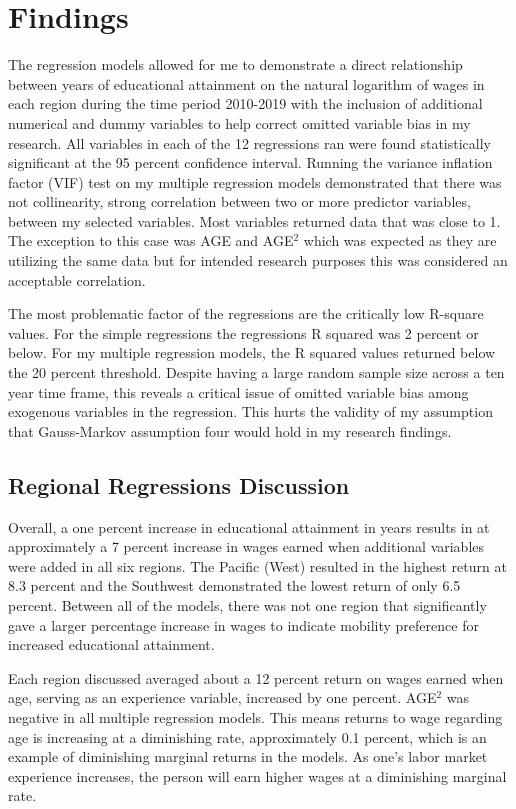 \documentclass[12pt, English]{article}
\begin{document}
\section{Findings}
The regression models allowed for me to demonstrate a direct relationship between years of educational attainment on the natural logarithm of wages in each region during the time period 2010-2019 with the inclusion of additional numerical and dummy variables to help correct omitted variable bias in my research. All variables in each of the 12 regressions ran were found statistically significant at the 95 percent confidence interval. Running the variance inflation factor (VIF) test on my multiple regression models demonstrated that there was not collinearity, strong correlation between two or more predictor variables, between my selected variables. Most variables returned data that was close to 1. The exception to this case was AGE and AGE$^2$ which was expected as they are utilizing the same data but for intended research purposes this was considered an acceptable correlation.

The most problematic factor of the regressions are the critically low R-square values. For the simple regressions the regressions R squared was 2 percent or below. For my multiple regression models, the R squared values returned below the 20 percent threshold. Despite having a large random sample size across a ten year time frame, this reveals a critical issue of omitted variable bias among exogenous variables in the regression. This hurts the validity of my assumption that Gauss-Markov assumption four would hold in my research findings. 

\subsection{Regional Regressions Discussion}
Overall, a one percent increase in educational attainment in years results in at approximately a 7 percent increase in wages earned when additional variables were added in all six regions. The Pacific (West) resulted in the highest return at 8.3 percent and the Southwest demonstrated the lowest return of only 6.5  percent. Between all of the models, there was not one region that significantly gave a larger percentage increase in wages to indicate mobility preference for increased educational attainment. 

Each region discussed averaged about a 12 percent return on wages earned when age, serving as an experience variable, increased by one percent. AGE$^2$ was negative in all multiple regression models. This means returns to wage regarding age is increasing at a diminishing rate, approximately 0.1 percent, which is an example of diminishing marginal returns in the models. As one’s labor market experience increases, the person will earn higher wages at a diminishing marginal rate.
\end{document}
